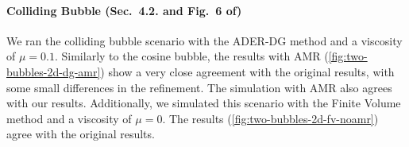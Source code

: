 \documentclass[runningheads]{llncs}
\begin{document}
\paragraph{Colliding Bubble (Sec.~4.2. and Fig.~6 of\cite{krenz2019high})}
We ran the colliding bubble scenario with the ADER-DG method and a viscosity of $\mu=0.1$.
Similarly to the cosine bubble, the results with AMR (\cref{fig:two-bubbles-2d-dg-amr}) show a very close agreement with the original results, with some small differences in the refinement.
The simulation with AMR also agrees with our results.
Additionally, we simulated this scenario with the Finite Volume method and a viscosity of $\mu=0$.
The results (\cref{fig:two-bubbles-2d-fv-noamr}) agree with the original results.



{}
\end{document}
